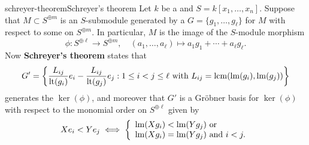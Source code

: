 \begin{topic}{schreyer-theorem}{Schreyer's theorem}
    Let $k$ be a  and $S = k[x_1, \ldots, x_n]$.
    Suppose that $M \subset S^{\oplus m}$ is an $S$-submodule generated by a  $G = \{ g_1, \ldots, g_\ell \}$ for $M$ with respect to some  on $S^{\oplus m}$. In particular, $M$ is the image of the $S$-module morphism
    \[ \phi : S^{\oplus \ell} \to S^{\oplus m}, \quad (a_1, \ldots, a_\ell) \mapsto a_1 g_1 + \cdots + a_\ell g_\ell . \]
    Now \textbf{Schreyer's theorem} states that
    \[ G' = \left\{ \frac{L_{ij}}{\operatorname{lt}(g_i)} e_i - \frac{L_{ij}}{\operatorname{lt}(g_j)} e_j : 1 \le i < j \le \ell \textup{ with } L_{ij} = \operatorname{lcm}(\operatorname{lm}(g_i), \operatorname{lm}(g_j)) \right\} \]
    generates the  $\ker(\phi)$, and moreover that $G'$ is a Gröbner basis for $\ker(\phi)$ with respect to the monomial order on $S^{\oplus \ell}$ given by
    \[ X e_i < Y e_j \iff \left\{ \begin{array}{l} \operatorname{lm}(X g_i) < \operatorname{lm}(Y g_j) \textup{ or } \\ \operatorname{lm}(X g_i) = \operatorname{lm}(Y g_j) \textup{ and } i < j . \end{array} \right. \]
\end{topic}
